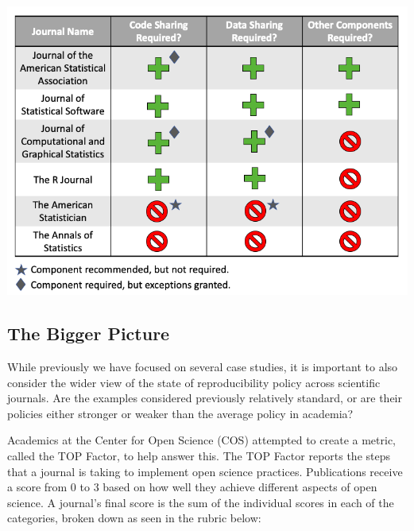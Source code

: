\documentclass[12pt,twoside]{reedthesis}
\begin{document}
\includegraphics[width=1\linewidth]{figure/stats-journals}

\subsection{The Bigger Picture}\label{the-bigger-picture}

While previously we have focused on several case studies, it is
important to also consider the wider view of the state of
reproducibility policy across scientific journals. Are the examples
considered previously relatively standard, or are their policies either
stronger or weaker than the average policy in academia?

Academics at the Center for Open Science (COS) attempted to create a
metric, called the TOP Factor, to help answer this. The TOP Factor
reports the steps that a journal is taking to implement open science
practices. Publications receive a score from 0 to 3 based on how well
they achieve different aspects of open science. A journal's final score
is the sum of the individual scores in each of the categories, broken
down as seen in the rubric below:
\end{document}
